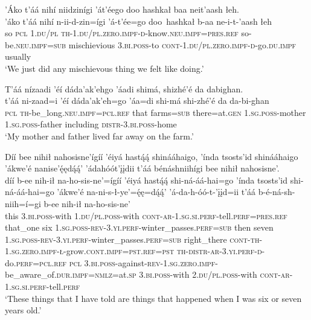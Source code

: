 \ea\label{ex:text6-10-3}
’Áko t’áá nihí niidzinígi ’át’éego doo hashkał baa neit’aash łeh.\\
\gll ’áko	t’áá	nihí	n-ii-d-zin=ígi	’á-t’ée=go	doo~{hashkał}	b-aa	ne-i-t-’aash	łeh\\
     so	\textsc{pcl}	1.\textsc{du}/\textsc{pl}	\textsc{th}-1.\textsc{du}/\textsc{pl}.\textsc{zero}.\textsc{impf}-\textsc{d}-know.\textsc{neu}.\textsc{impf}=\textsc{pres}.\textsc{ref}	so-be.\textsc{neu}.\textsc{impf}=\textsc{sub}	mischievious	3.\textsc{bi}.\textsc{poss}-to	\textsc{cont}-1.\textsc{du}/\textsc{pl}.\textsc{zero}.\textsc{impf}-\textsc{d}-go.\textsc{du}.\textsc{impf}	usually\\
\glt `We just did any mischievous thing we felt like doing.'
\z

\ea\label{ex:text6-10-4}
T’áá nízaadi ’éí dáda’ak’ehgo ’áadi shimá, shizhé’é da dabighan.\\
\gll t’áá	ni-zaad=i	’éí	dáda’ak’eh=go	’áa=di	shi-má	shi-zhé’é	da	da-bi-ghan\\
     \textsc{pcl}	\textsc{th}-be\_long.\textsc{neu}.\textsc{impf}=\textsc{pcl}.\textsc{ref}	that	farms=\textsc{sub}	there=at.\textsc{gen}	1.\textsc{sg}.\textsc{poss}-mother	1.\textsc{sg}.\textsc{poss}-father	including	\textsc{distr}-3.\textsc{bi}.\textsc{poss}-home\\
\glt `My mother and father lived far away on the farm.'
\z

\ea\label{ex:text6-11-1}
Díí bee nihił nahosisne’ígíí ’éiyá hastą́ą́ shinááhaigo, ’índa tsosts’id shinááhaigo ’ákwe’é nanise’ę́ędą́ą́’ ’ádahóót’įįdii t’áá bénáshniihígi bee nihił nahosisne’.\\
\gll díí	b-ee	nih-ił	na-ho-sis-ne’=ígíí	’éiyá	hastą́ą́	shi-ná-áá-hai=go	’índa	tsosts’id	shi-ná-áá-hai=go	’ákwe’é	na-ni-s-ł-ye’=ę́ę=dą́ą́’	’á-da-h-óó-t-’įįd=ii	t’áá	b-é-ná-sh-niih=í=gi	b-ee	nih-ił	na-ho-sis-ne’\\
     this	3.\textsc{bi}.\textsc{poss}-with	1.\textsc{du}/\textsc{pl}.\textsc{poss}-with	\textsc{cont}-\textsc{ar}-1.\textsc{sg}.\textsc{si}.\textsc{perf}-tell.\textsc{perf}=\textsc{pres}.\textsc{ref}	that\_one	six	1.\textsc{sg}.\textsc{poss}-\textsc{rev}-3.\textsc{yi}.\textsc{perf}-winter\_passes.\textsc{perf}=\textsc{sub}	then	seven	1.\textsc{sg}.\textsc{poss}-\textsc{rev}-3.\textsc{yi}.\textsc{perf}-winter\_passes.\textsc{perf}=\textsc{sub}	right\_there	\textsc{cont}-\textsc{th}-1.\textsc{sg}.\textsc{zero}.\textsc{impf}-\textsc{ł}-grow.\textsc{cont}.\textsc{impf}=\textsc{pst}.\textsc{ref}=\textsc{pst}	\textsc{th}-\textsc{distr}-\textsc{ar}-3.\textsc{yi}.\textsc{perf}-\textsc{d}-do.\textsc{perf}=\textsc{pcl}.\textsc{ref}	\textsc{pcl}	3.\textsc{bi}.\textsc{poss}-against-\textsc{rev}-1.\textsc{sg}.\textsc{zero}.\textsc{impf}-be\_aware\_of.\textsc{dur}.\textsc{impf}=\textsc{nmlz}=at.\textsc{sp}	3.\textsc{bi}.\textsc{poss}-with	2.\textsc{du}/\textsc{pl}.\textsc{poss}-with	\textsc{cont}-\textsc{ar}-1.\textsc{sg}.\textsc{si}.\textsc{perf}-tell.\textsc{perf}\\
\glt `These things that I have told are things that happened when I was six or seven years old.'
\z

